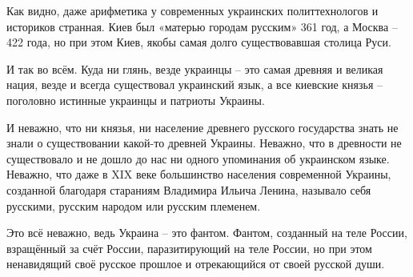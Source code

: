Как видно, даже арифметика у современных украинских политтехнологов и историков
странная. Киев был «матерью городам русским» 361 год, а Москва – 422 года, но
при этом Киев, якобы самая долго существовавшая столица Руси.

И так во всём. Куда ни глянь, везде украинцы – это самая древняя и великая
нация, везде и всегда существовал украинский язык, а все киевские князья –
поголовно истинные украинцы и патриоты Украины.

И неважно, что ни князья, ни население древнего русского государства знать не
знали о существовании какой-то древней Украины. Неважно, что в древности не
существовало и не дошло до нас ни одного упоминания об украинском языке.
Неважно, что даже в XIX веке большинство населения современной Украины,
созданной благодаря стараниям Владимира Ильича Ленина, называло себя русскими,
русским народом или русским племенем.

Это всё неважно, ведь Украина – это фантом. Фантом, созданный на теле России,
взращённый за счёт России, паразитирующий на теле России, но при этом
ненавидящий своё русское прошлое и отрекающийся от своей русской души.

